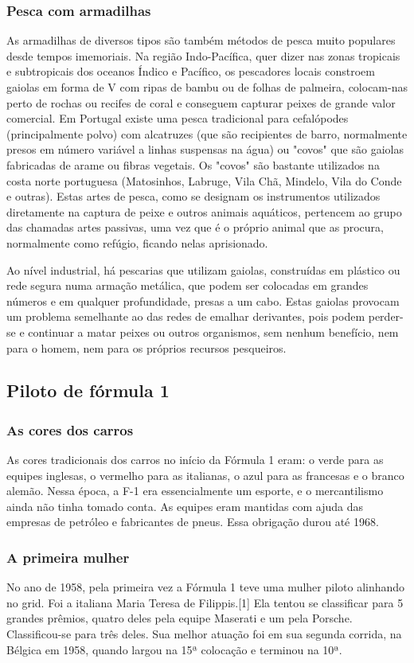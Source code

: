 \documentclass[a4paper,10pt]{article}
\begin{document}
\subsubsection{Pesca com armadilhas}
As armadilhas de diversos tipos são também métodos de pesca muito populares desde tempos imemoriais. Na região Indo-Pacífica, quer dizer nas zonas tropicais e subtropicais dos oceanos Índico e Pacífico, os pescadores locais constroem gaiolas em forma de V com ripas de bambu ou de folhas de palmeira, colocam-nas perto de rochas ou recifes de coral e conseguem capturar peixes de grande valor comercial. Em Portugal existe uma pesca tradicional para cefalópodes (principalmente polvo) com alcatruzes (que são recipientes de barro, normalmente presos em número variável a linhas suspensas na água) ou "covos" que são gaiolas fabricadas de arame ou fibras vegetais. Os "covos" são bastante utilizados na costa norte portuguesa (Matosinhos, Labruge, Vila Chã, Mindelo, Vila do Conde e outras). Estas artes de pesca, como se designam os instrumentos utilizados diretamente na captura de peixe e outros animais aquáticos, pertencem ao grupo das chamadas artes passivas, uma vez que é o próprio animal que as procura, normalmente como refúgio, ficando nelas aprisionado.

Ao nível industrial, há pescarias que utilizam gaiolas, construídas em plástico ou rede segura numa armação metálica, que podem ser colocadas em grandes números e em qualquer profundidade, presas a um cabo. Estas gaiolas provocam um problema semelhante ao das redes de emalhar derivantes, pois podem perder-se e continuar a matar peixes ou outros organismos, sem nenhum benefício, nem para o homem, nem para os próprios recursos pesqueiros.

\subsection{Piloto de fórmula 1}
\subsubsection {As cores dos carros}
As cores tradicionais dos carros no início da Fórmula 1 eram: o verde para as equipes inglesas, o vermelho para as italianas, o azul para as francesas e o branco alemão. Nessa época, a F-1 era essencialmente um esporte, e o mercantilismo ainda não tinha tomado conta. As equipes eram mantidas com ajuda das empresas de petróleo e fabricantes de pneus. Essa obrigação durou até 1968.
\subsubsection{A primeira mulher}
No ano de 1958, pela primeira vez a Fórmula 1 teve uma mulher piloto alinhando no grid. Foi a italiana Maria Teresa de Filippis.[1] Ela tentou se classificar para 5 grandes prêmios, quatro deles pela equipe Maserati e um pela Porsche. Classificou-se para três deles. Sua melhor atuação foi em sua segunda corrida, na Bélgica em 1958, quando largou na 15ª colocação e terminou na 10ª.
\end{document}

